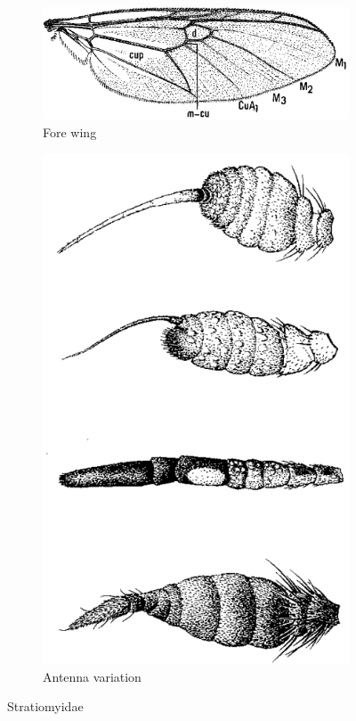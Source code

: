 \documentclass[letterpaper, 11pt]{article}
\begin{document}
\begin{figure}[ht!]
    \centering
    \begin{subfigure}[ht!]{0.5\textwidth}
        \includegraphics[width=\textwidth]{StratiomyidWing}
        \caption{Fore wing \citep[][Fig. 36.33]{mcalpine1981manual}}
        \label{fig:stratiomyid1}
    \end{subfigure}
    \qquad
    \begin{subfigure}[ht!]{0.2\textwidth}
        \includegraphics[width=\textwidth]{StratiomyidAntennae}
        \caption{Antenna variation \citep[][Figs. 36.9,12,15,18]{mcalpine1981manual}}
        \label{fig:stratiomyid2}
    \end{subfigure}
    \caption{Stratiomyidae}\label{fig:stratiomyids}
\end{figure}
\end{document}
